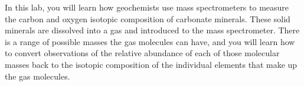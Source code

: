     In this lab, you will learn how geochemists use mass spectrometers to measure the carbon and oxygen isotopic composition of carbonate minerals.
 These solid minerals are dissolved into a gas and introduced to the mass spectrometer. There is a range of possible masses the gas molecules can have, and you will learn how to convert observations of the relative abundance of each of those molecular masses back to the isotopic composition of the individual elements that make up the gas molecules. 
